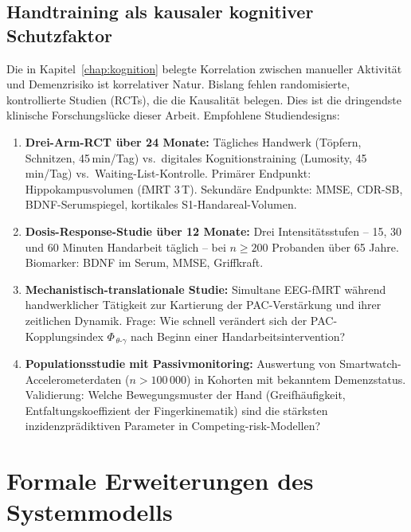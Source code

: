 ﻿\documentclass[12pt,a4paper]{report}
\theoremstyle{plain}
\theoremstyle{definition}
\theoremstyle{remark}
\begin{document}
\subsection{Handtraining als kausaler kognitiver Schutzfaktor}

Die in Kapitel~\ref{chap:kognition} belegte Korrelation zwischen
manueller Aktivität und Demenzrisiko ist korrelativer Natur. Bislang
fehlen randomisierte, kontrollierte Studien (RCTs), die die Kausalität
belegen. Dies ist die dringendste klinische Forschungslücke dieser Arbeit.
Empfohlene Studiendesigns:

\begin{enumerate}
\item \textbf{Drei-Arm-RCT über 24 Monate:} Tägliches Handwerk
  (Töpfern, Schnitzen, 45\,min/Tag) vs.\ digitales Kognitionstraining
  (Lumosity, 45\,min/Tag) vs.\ Waiting-List-Kontrolle. Primärer Endpunkt:
  Hippokampusvolumen (fMRT 3\,T). Sekundäre Endpunkte: MMSE, CDR-SB,
  BDNF-Serumspiegel, kortikales S1-Handareal-Volumen.
\item \textbf{Dosis-Response-Studie über 12 Monate:} Drei Intensitätsstufen
  -- 15, 30 und 60 Minuten Handarbeit täglich -- bei $n \geq 200$
  Probanden über 65 Jahre. Biomarker: BDNF im Serum, MMSE, Griffkraft.
\item \textbf{Mechanistisch-translationale Studie:} Simultane EEG-fMRT
  während handwerklicher Tätigkeit zur Kartierung der PAC-Verstärkung
  und ihrer zeitlichen Dynamik. Frage: Wie schnell verändert sich der
  PAC-Kopplungsindex $\Phi_{\,\theta\text{-}\gamma}$ nach Beginn einer
  Handarbeitsintervention?
\item \textbf{Populationsstudie mit Passivmonitoring:} Auswertung von
  Smartwatch-Accelerometerdaten ($n > 100\,000$) in Kohorten mit
  bekanntem Demenzstatus. Validierung: Welche Bewegungsmuster der Hand
  (Greifhäufigkeit, Entfaltungskoeffizient der Fingerkinematik) sind
  die stärksten inzidenzprädiktiven Parameter in Competing-risk-Modellen?
\end{enumerate}

\section{Formale Erweiterungen des Systemmodells}
\end{document}
